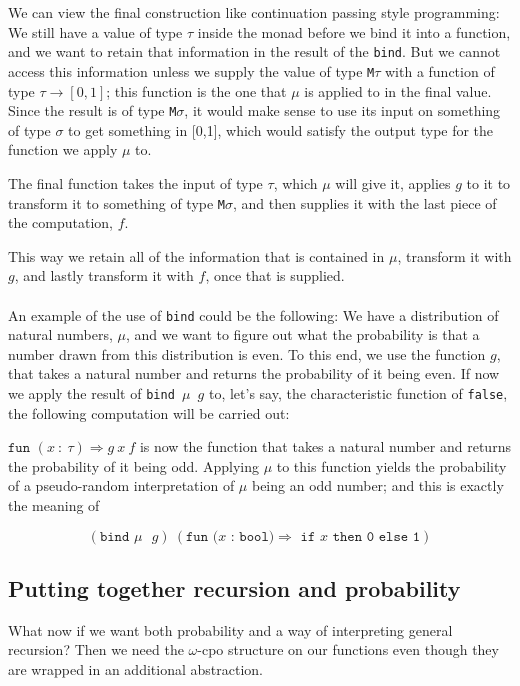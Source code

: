 \documentclass[11pt, leqno, titlepage]{article}
\theoremstyle{definition}
\begin{document}
We can view the final construction like continuation passing style programming: We
still have a value of type $\tau$ inside the monad before we bind it into a function,
and we want to retain that information in the result of the \texttt{bind}. But we
cannot access this information unless we supply the value of type \texttt{M}$\tau$
with a function of type $\tau \to [0,1]$; this function is the one that $\mu$ is
applied to in the final value. Since the result is of type \texttt{M}$\sigma$, it
would make sense to use its input on something of type $\sigma$ to get something in
[0,1], which would satisfy the output type for the function we apply $\mu$ to.

The final function takes the input of type $\tau$, which $\mu$ will give it,
applies $g$ to it to transform it to something of type \texttt{M}$\sigma$, and then
supplies it with the last piece of the computation, $f$.

This way we retain all of the information that is contained in $\mu$, transform it
with $g$, and lastly transform it with $f$, once that is supplied.\\
\\
An example of the use of \texttt{bind} could be the following: We have a distribution
of natural numbers, $\mu$, and we want to figure out what the probability is that a
number drawn from this distribution is even. To this end, we use the function $g$,
that takes a natural number and returns the probability of it being even. If now we
apply the result of \texttt{bind $\mu$ $g$} to, let's say, the characteristic
function of \texttt{false}, the following computation will be carried out:

$\texttt{fun }(x~:~\tau)\Rightarrow g~x~f$ is now the function that takes a natural
number and returns the probability of it being odd. Applying $\mu$ to this function
yields the probability of a pseudo-random interpretation of $\mu$ being an odd
number; and this is exactly the meaning of

$$(\texttt{bind $\mu$ $g$})~(\texttt{fun
  $(x$ : bool$)\Rightarrow$ if $x$ then 0 else 1})$$

\subsection{Putting together recursion and probability}
\label{sec:prob-rec}
What now if we want both probability and a way of interpreting general recursion?
Then we need the $\omega$-cpo structure on our functions even though they are wrapped
in an additional abstraction.
\end{document}
